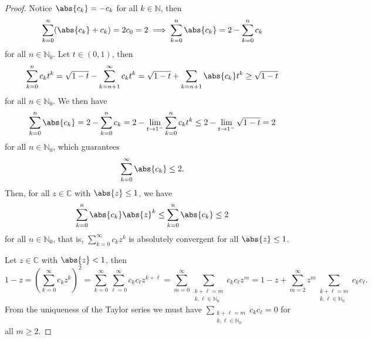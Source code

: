 \begin{proof}
    Notice \(\abs{c_k} = - c_k\) for all \(k \in \mathbb{N}\), then
    \begin{equation*}
        \sum_{k = 0}^n (\abs{c_k} + c_k) = 2c_0 = 2 \implies \sum_{k = 0}^n \abs{c_k} = 2 - \sum_{k = 0}^n c_k
    \end{equation*}
    for all \(n \in \mathbb{N}_0\). Let \(t \in (0,1)\), then
    \begin{equation*}
        \sum_{k=0}^n c_k t^k = \sqrt{1 - t} - \sum_{k = {n+1}}^\infty c_k t^k = \sqrt{1 - t} + \sum_{k = n+1} \abs{c_k}t^k \geq \sqrt{1 - t}
    \end{equation*}
    for all \(n \in \mathbb{N}_0\). We then have
    \begin{equation*}
        \sum_{k = 0}^n \abs{c_k} = 2 - \sum_{k = 0}^n c_k = 2 - \lim_{t \to 1^{-}}\sum_{k = 0}^{n} c_k t^k \leq 2 - \lim_{t \to 1^{-}} \sqrt{1 - t} = 2
    \end{equation*}
    for all \(n \in \mathbb{N}_0\), which guarantees
    \begin{equation*}
        \sum_{k = 0}^\infty \abs{c_k} \leq 2.
    \end{equation*}
    Then, for all \(z \in \mathbb{C}\) with \(\abs{z} \leq 1\), we have
    \begin{equation*}
        \sum_{k = 0}^n \abs{c_k}\abs{z}^k \leq \sum_{k = 0}^n \abs{c_k} \leq 2
    \end{equation*}
    for all \(n \in \mathbb{N}_0\), that is, \(\sum_{k = 0}^\infty c_k z^k\) is absolutely convergent for all \(\abs{z} \leq 1\).

    Let \(z \in \mathbb{C}\) with \(\abs{z} < 1\), then
    \begin{equation*}
        1 - z = \left(\sum_{k = 0}^\infty c_k z^k\right)^2 = \sum_{k = 0}^\infty \sum_{\ell = 0}^\infty c_k c_\ell z^{k + \ell} = \sum_{m = 0}^\infty \sum_{\substack{k + \ell = m\\k,\ell \in \mathbb{N}_0}} c_kc_\ell z^m = 1 - z + \sum_{m = 2}^\infty z^m\sum_{\substack{k + \ell = m\\k,\ell \in \mathbb{N}_0}}c_k c_\ell.
    \end{equation*}
    From the uniqueness of the Taylor series we must have \(\sum_{\substack{k+\ell=m\\k,\ell \in \mathbb{N}_0}} c_k c_\ell = 0\) for all \(m \geq 2\).
\end{proof}

